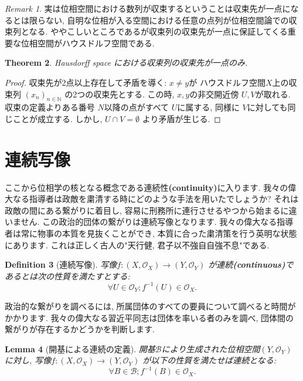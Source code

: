 \documentclass[lualatex]{ltjsbook}
\newtheorem{theorem}{Theorem}[chapter]
\newtheorem{lemma}[theorem]{Lemma}
\newtheorem{definition}[theorem]{Definition}
\theoremstyle{remark}
\newtheorem{remark}[theorem]{Remark}
\theoremstyle{plain}
\begin{document}
\begin{remark}
実は位相空間における数列が収束するということは収束先が一点になるとは限らない,  自明な位相が入る空間における任意の点列が位相空間論での収束列となる. 
ややこしいところであるが収束列の収束先が一点に保証してくる重要な位相空間がハウスドルフ空間である.	
\end{remark}

\begin{theorem}
Hausdorff space における収束列の収束先が一点のみ.
\end{theorem}

\begin{proof}
	収束先が2点以上存在して矛盾を導く: $x \neq y$が ハウスドルフ空間$X$上の収束列 $\left( x_n \right) _{n \in \mathbb{N} }$ の2つの収束先とする. 
	この時, $x, y$の非交開近傍 $U, V$が取れる. 
	収束の定義よりある番号 $N$以降の点がすべて $U$に属する,  同様に $V$に対しても同じことが成立する. 
	しかし,   $U\cap V = \emptyset$ より矛盾が生じる.
\end{proof}

\section{連続写像}%
\label{sec:連続写像}
ここから位相学の核となる概念である連続性\textbf{(continuity)}に入ります.
我々の偉大なる指導者は政敵を粛清する時にどのような手法を用いたでしょうか? 
それは政敵の間にある繋がりに着目し,  容易に刑務所に連行させるやつから始まるに違いません. この政治的団体の繋がりは連続写像となります. 
我々の偉大なる指導者は常に物事の本質を見抜くことができ,  本質に合った粛清策を行う英明な状態にあります. これは正しく古人の"天行健,  君子以不強自自強不息"である.
\begin{definition}[連続写像]
	写像$f: \left( X ,  \mathcal{O}_X \right) \to \left( Y,  \mathcal{O}_Y \right) $ が連続\textbf{(continuous)}であるとは次の性質を満たすとする:
	\[
	\forall U \in \mathcal{O}_Y; f^{-1}\left( U \right) \in \mathcal{O}_X 
	.\] 
\end{definition}

政治的な繋がりを調べるには,  所属団体のすべての要員について調べると時間がかかります. 我々の偉大なる習近平同志は団体を率いる者のみを調べ,  団体間の繋がりが存在するかどうかを判断します.

\begin{lemma}[開基による連続の定義]
開基$\mathcal{B}$により生成された位相空間$\left( Y,  \mathcal{O}_Y \right) $に対し, 
写像$f: \left( X ,  \mathcal{O}_X \right) \to \left( Y,  \mathcal{O}_Y \right) $ が以下の性質を満たせば連続となる:
\[
\forall B \in \mathcal{B}; f^{-1}\left( B \right) \in \mathcal{O}_X
.\] 

\end{lemma}
\end{document}
